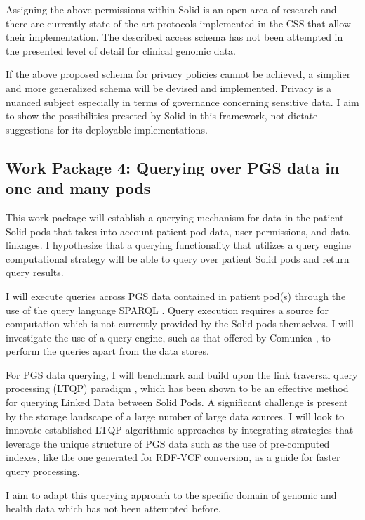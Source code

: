 \documentclass[runningheads]{llncs}
\begin{document}
Assigning the above permissions within Solid is an open area of research and there are currently state-of-the-art protocols implemented in the CSS that allow their implementation.
The described access schema has not been attempted in the presented level of detail for clinical genomic data.

If the above proposed schema for privacy policies cannot be achieved, a simplier and more generalized schema will be devised and implemented.
Privacy is a nuanced subject especially in terms of governance concerning sensitive data. 
I aim to show the possibilities preseted by Solid in this framework, not dictate suggestions for its deployable implementations. 

\subsection{Work Package 4: Querying over PGS data in one and many pods}

This work package will establish a querying mechanism for data in the patient Solid pods that takes into account patient pod data, user permissions, and data linkages. 
I hypothesize that a querying functionality that utilizes a query engine computational strategy will be able to query over patient Solid pods and return query results.

I will execute queries across PGS data contained in patient pod(s) through the use of the query language SPARQL \cite{noauthor_sparql_nodate}.
Query execution requires a source for computation which is not currently provided by the Solid pods themselves.
I will investigate the use of a query engine, such as that offered by Comunica \cite{comunica}, to perform the queries apart from the data stores.

For PGS data querying, I will benchmark and build upon the link traversal query processing (LTQP) paradigm \cite{taelman_evaluation_2023}, which has been shown to be an effective method for querying Linked Data between Solid Pods. 
A significant challenge is present by the storage landscape of a large number of large data sources.
I will look to innovate established LTQP algorithmic approaches by integrating strategies that leverage the unique structure of PGS data such as the use of pre-computed indexes, like the one generated for RDF-VCF conversion, as a guide for faster query processing.

I aim to adapt this querying approach to the specific domain of genomic and health data which has not been attempted before. 
\end{document}
